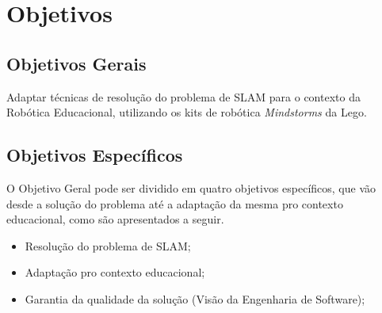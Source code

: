 	

	\section{Objetivos}

	\subsection{Objetivos Gerais} %
	\label{sub:objetivos_gerais}
	
		Adaptar técnicas de resolução do problema de SLAM para o contexto da Robótica Educacional, utilizando os kits de robótica \textit{Mindstorms} da Lego.


	\subsection{Objetivos Específicos} %
	\label{sub:objetivos_específicos}

		O Objetivo Geral pode ser dividido em quatro objetivos específicos, que vão desde a solução do problema até a adaptação da mesma pro contexto educacional, como são apresentados a seguir.
		 
	\begin{itemize}
		\item Resolução do problema de SLAM;
		\item Adaptação pro contexto educacional;
		\item Garantia da qualidade da solução (Visão da Engenharia de Software); 
	\end{itemize}
	
